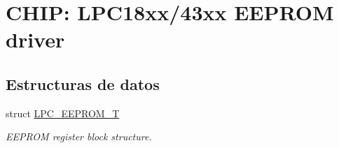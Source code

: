\hypertarget{group___e_e_p_r_o_m__18_x_x__43_x_x}{}\section{C\+H\+IP\+: L\+P\+C18xx/43xx E\+E\+P\+R\+OM driver}
\label{group___e_e_p_r_o_m__18_x_x__43_x_x}
\subsection*{Estructuras de datos}
\begin{DoxyCompactItemize}
\item 
struct \hyperlink{struct_l_p_c___e_e_p_r_o_m___t}{L\+P\+C\+\_\+\+E\+E\+P\+R\+O\+M\+\_\+T}
\begin{DoxyCompactList}\small\item\em E\+E\+P\+R\+OM register block structure. \end{DoxyCompactList}\end{DoxyCompactItemize}
